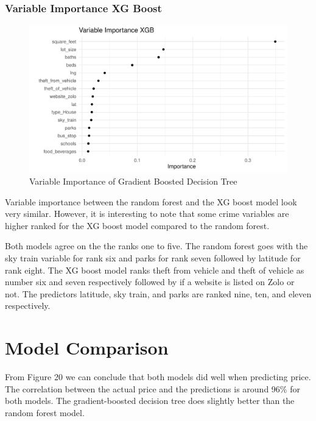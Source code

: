 \documentclass[
]{article}
\begin{document}
\hypertarget{variable-importance-xg-boost}{%
\subsubsection{Variable Importance XG
Boost}\label{variable-importance-xg-boost}}

\begin{figure}
\centering
\includegraphics{final_report_files/figure-latex/unnamed-chunk-38-1.pdf}
\caption{Variable Importance of Gradient Boosted Decision Tree}
\end{figure}

Variable importance between the random forest and the XG boost model
look very similar. However, it is interesting to note that some crime
variables are higher ranked for the XG boost model compared to the
random forest.

Both models agree on the the ranks one to five. The random forest goes
with the sky train variable for rank six and parks for rank seven
followed by latitude for rank eight. The XG boost model ranks theft from
vehicle and theft of vehicle as number six and seven respectively
followed by if a website is listed on Zolo or not. The predictors
latitude, sky train, and parks are ranked nine, ten, and eleven
respectively.

\hypertarget{model-comparison}{%
\section{Model Comparison}\label{model-comparison}}

From Figure 20 we can conclude that both models did well when predicting
price. The correlation between the actual price and the predictions is
around 96\% for both models. The gradient-boosted decision tree does
slightly better than the random forest model.
\end{document}
